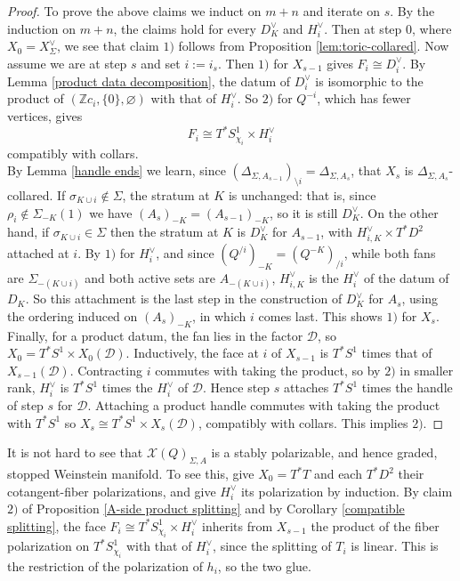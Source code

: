 \documentclass[11pt]{amsart}
\theoremstyle{definition}
\theoremstyle{remark}
\renewcommand{\emptyset}{\varnothing}
\numberwithin{equation}{section}
\begin{document}
\begin{proof}
   To prove the above claims we induct on $m + n$ and iterate on $s$. By the induction on $m+n$, the claims hold for every $D_K^\vee$ and $H_i^\vee$. Then at step 0, where $X_0 = X_\Sigma^\vee$, we see that claim $1)$ follows from Proposition \ref{lem:toric-collared}. Now assume we are at step $s$ and set $i := i_s$.  Then $1)$ for $X_{s-1}$ gives $F_i\cong D_i^\vee$. By Lemma \ref{product data decomposition}, the datum of $D_i^\vee$ is isomorphic to the product of $(\mathbb Zc_i,\{0\},\emptyset)$ with that of $H_i^\vee$. So $2)$ for $Q^{-i}$, which has fewer vertices, gives
$$F_i\cong T^*S^1_{\chi_i}\times H_i^\vee$$
compatibly with collars.\\

By Lemma \ref{handle ends} we learn, since $(\Delta_{\Sigma,A_{s-1}})_{\setminus i}=\Delta_{\Sigma,A_s}$, that $X_s$ is $\Delta_{\Sigma,A_s}$-collared. If $\sigma_{K\cup i}\notin\Sigma$, the stratum at $K$ is unchanged: that is, since $\rho_i\notin\Sigma_{-K}(1)$ we have $(A_s)_{-K}=(A_{s-1})_{-K}$, so it is still $D_K^\vee$.
On the other hand, if $\sigma_{K\cup i}\in\Sigma$ then the stratum at $K$ is $D_K^\vee$ for $A_{s-1}$, with $H^\vee_{i,K}\times T^*D^2$ attached at $i$. By $1)$ for $H_i^\vee$, and since $(Q^{/i})_{-K}=(Q^{-K})_{/i}$, while both fans are $\Sigma_{-(K\cup i)}$ and both active sets are $A_{-(K\cup i)}$, $H^\vee_{i,K}$ is the $H_i^\vee$ of the datum of $D_K$. So this attachment is the last step in the construction of $D_K^\vee$ for $A_s$, using the ordering induced on $(A_s)_{-K}$, in which $i$ comes last. This shows $1)$ for $X_s$.\\

Finally, for a product datum, the fan lies in the factor $\mathcal D$, so $X_0=T^*S^1\times X_0(\mathcal D)$. Inductively, the face at $i$ of $X_{s-1}$ is $T^*S^1$ times that of $X_{s-1}(\mathcal D)$. Contracting $i$ commutes with taking the product, so by $2)$ in smaller rank, $H_i^\vee$ is $T^*S^1$ times the $H_i^\vee$ of $\mathcal D$. Hence step $s$ attaches $T^*S^1$ times the handle of step $s$ for $\mathcal D$. Attaching a product handle commutes with taking the product with $T^*S^1$ so $X_s\cong T^*S^1\times X_s(\mathcal D)$, compatibly with collars. This implies $2)$. 
\end{proof}

It is not hard to see that $\mathcal{X}(Q)_{\Sigma, A}$ is a stably polarizable, and hence graded, stopped Weinstein manifold. To see this, give $X_0=T^*T$ and each $T^*D^2$ their cotangent-fiber polarizations, and give $H_i^\vee$ its polarization by induction. By claim $2)$ of Proposition \ref{A-side product splitting} and by Corollary \ref{compatible splitting}, the face $F_i\cong T^*S^1_{\chi_i}\times H_i^\vee$ inherits from $X_{s-1}$ the product of the fiber polarization on $T^*S^1_{\chi_i}$ with that of $H_i^\vee$, since the splitting of $T_i$ is linear. This is the restriction of the polarization of $h_i$, so the two glue.
\end{document}
